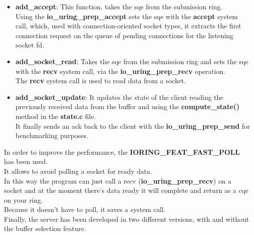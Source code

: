 \documentclass[10pt, oneside,english]{article}   	%
\begin{document}
\begin{itemize}
    \item \textbf{add\_accept}: This function, takes the sqe from the submission ring. \\ Using the \textbf{io\_uring\_prep\_accept} sets the sqe with the \textbf{accept} system call, which, used with connection-oriented socket types, it extracts the first connection request on the queue of pending connections for the listening socket fd.
    \item \textbf{add\_socket\_read}: Takes the sqe from the submission ring and sets the sqe with the \textbf{recv} system call, via the \textbf{io\_uring\_prep\_recv} operation. \\ The \textbf{recv} system call is used to read data from a socket.
    \item \textbf{add\_socket\_update}: It updates the state of the client reading the previously received data from the buffer and using the \textbf{compute\_state()} method in the \textbf{state.c} file.\\ It finally sends an ack back to the client with the \textbf{io\_uring\_prep\_send} for benchmarking purposes.
\end{itemize}

In order to improve the performance, the  \textbf{IORING\_FEAT\_FAST\_POLL} has been used. \\
It allows to avoid polling a socket for ready data.  \\
In this way the program can just call a recv (\textbf{io\_uring\_prep\_recv}) on a socket and at the moment there’s data ready it will complete and return as a cqe on your ring.  \\
Because it doesn’t have to poll, it saves a system call. \\
Finally, the server has been developed in two different versions, with and without the buffer selection feature. \\
\end{document}
